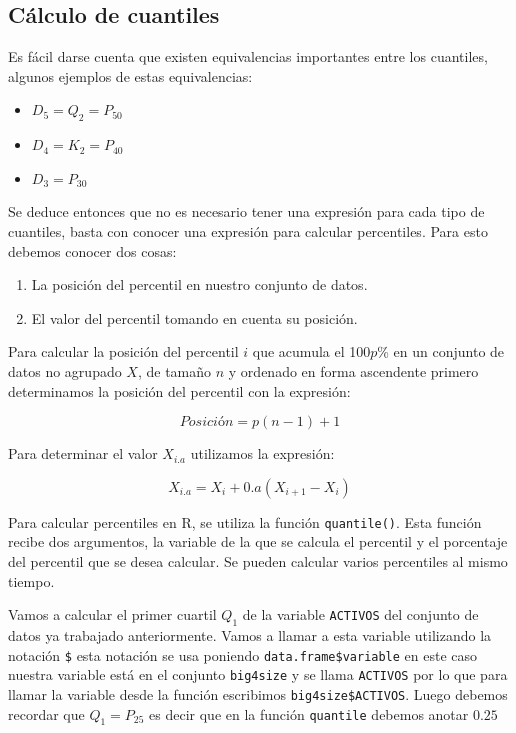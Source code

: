 \documentclass[]{book}
\providecommand{\tightlist}{%
  \setlength{\itemsep}{0pt}\setlength{\parskip}{0pt}}
\begin{document}
\hypertarget{calculo-de-cuantiles}{%
\subsection{Cálculo de cuantiles}\label{calculo-de-cuantiles}}

Es fácil darse cuenta que existen equivalencias importantes entre los cuantiles, algunos ejemplos de estas equivalencias:

\begin{itemize}
\tightlist
\item
  \(D_5=Q_2=P_{50}\)
\item
  \(D_4=K_2=P_{40}\)
\item
  \(D_3=P_{30}\)
\end{itemize}

Se deduce entonces que no es necesario tener una expresión para cada tipo de cuantiles, basta con conocer una expresión para calcular percentiles. Para esto debemos conocer dos cosas:

\begin{enumerate}
\def\labelenumi{\arabic{enumi}.}
\tightlist
\item
  La posición del percentil en nuestro conjunto de datos.
\item
  El valor del percentil tomando en cuenta su posición.
\end{enumerate}

Para calcular la posición del percentil \(i\) que acumula el 100\(p\)\% en un conjunto de datos no agrupado \(X\), de tamaño \(n\) y ordenado en forma ascendente primero determinamos la posición del percentil con la expresión:

\begin{equation} 
  Posición = p(n-1)+1
  \label{eq:posperc}
\end{equation}

Para determinar el valor \(X_{i.a}\) utilizamos la expresión:

\begin{equation} 
  X_{i.a}=X_{i}+0.a(X_{i+1}-X_{i})
  \label{eq:valperc}
\end{equation}

Para calcular percentiles en R, se utiliza la función \texttt{quantile()}. Esta función recibe dos argumentos, la variable de la que se calcula el percentil y el porcentaje del percentil que se desea calcular. Se pueden calcular varios percentiles al mismo tiempo.

Vamos a calcular el primer cuartil \(Q_{1}\) de la variable \texttt{ACTIVOS} del conjunto de datos ya trabajado anteriormente. Vamos a llamar a esta variable utilizando la notación \texttt{\$} esta notación se usa poniendo \texttt{data.frame\$variable} en este caso nuestra variable está en el conjunto \texttt{big4size} y se llama \texttt{ACTIVOS} por lo que para llamar la variable desde la función escribimos \texttt{big4size\$ACTIVOS}. Luego debemos recordar que \(Q_1=P_{25}\) es decir que en la función \texttt{quantile} debemos anotar \(0.25\)
\end{document}
